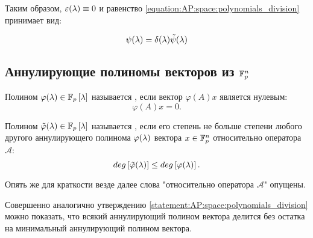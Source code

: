 \begin{statement}
	Таким образом, $\varepsilon (\lambda) \equiv 0$ и равенство \eqref{equation:AP:space:polynomials_division} принимает вид:

		$$ \psi (\lambda) = \delta (\lambda) \tilde\psi (\lambda) $$
\end{statement}

\subsection{Аннулирующие полиномы векторов из $\mathbb{F}^{n}_p$}

\begin{definition}
	Полином $\varphi (\lambda) \in \mathbb{F}_p \left [ \lambda \right ]$ называется , если вектор $\varphi(A) x$ является нулевым:
		$$ \varphi(A) x = 0. $$
\end{definition}

\begin{definition}
	Полином $\tilde\varphi (\lambda) \in \mathbb{F}_p \left [ \lambda \right ]$ называется , если его степень не больше степени любого другого аннулирующего полинома
	$\varphi (\lambda)$ вектора $x \in \mathbb{F}^{n}_p$ относительно оператора $\mathcal A$:
		$$ deg \left [ \tilde\varphi (\lambda) \right ] \le deg \left [ \varphi (\lambda) \right ]. $$
\end{definition}

Опять же для краткости везде далее слова "относительно оператора $\mathcal A$"{} опущены.

Совершенно аналогично утверждению \ref{statement:AP:space:polynomials_division} можно показать, что всякий аннулирующий полином вектора
делится без остатка на минимальный аннулирующий полином вектора.

